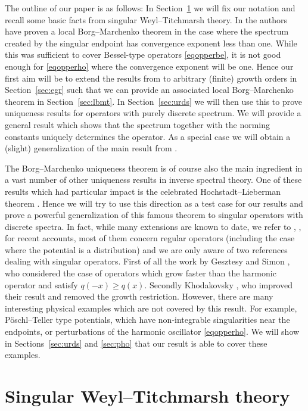 \documentclass{amsart}
\numberwithin{equation}{section}
\begin{document}
The outline of our paper is as follows: In Section~\ref{sec:swm} we will fix our notation and recall some basic facts from
singular Weyl--Titchmarsh theory. In \cite{kst2} the authors have proven a local Borg--Marchenko theorem in the case
where the spectrum created by the singular endpoint has convergence exponent less than one.  While this was
sufficient to cover Bessel-type operators \eqref{eqopperbe}, it is not good enough for \eqref{eqopperho} where the
convergence exponent will be one. Hence our first aim will be to extend the results from \cite{kst2} to arbitrary
(finite) growth orders in Section~\ref{sec:egr} such that we can provide an associated local Borg--Marchenko theorem
in Section~\ref{sec:lbmt}. In Section~\ref{sec:urds} we will then use this to prove uniqueness results for operators
with purely discrete spectrum. We will provide a general result which shows that the spectrum together with the
norming constants uniquely determines the operator. As a special case we will obtain a (slight) generalization of the
main result from \cite{ckk}.

The Borg--Marchenko uniqueness theorem is of course also the main ingredient in a vast number of other
uniqueness results in inverse spectral theory. One of these results which had particular impact is the celebrated
Hochstadt--Lieberman theorem \cite{hl}. Hence we will try to use this direction as a test case for our results and prove a
powerful generalization of this famous theorem to singular operators with discrete spectra. In fact, while
many extensions are known to date, we refer to \cite{sa}, \cite{ho}, \cite{hm} for recent accounts, most of them
concern regular operators (including the case where the potential is a distribution) and we are only aware of two references
dealing with singular operators. First of all the work by Gesztesy and Simon \cite{gs2}, who considered the case of operators which
grow faster than the harmonic operator and satisfy $q(-x)\ge q(x)$. Secondly Khodakovsky \cite{kh}, who improved their
result and removed the growth restriction. However, there are many interesting physical examples which are not
covered by this result. For example, P\"oschl--Teller type potentials, which have non-integrable singularities near the
endpoints, or perturbations of the harmonic oscillator \eqref{eqopperho}. We will show in Sections~\ref{sec:urds}
and \ref{sec:pho} that our result is able to cover these examples.

\section{Singular Weyl--Titchmarsh theory}
\label{sec:swm}
\end{document}
